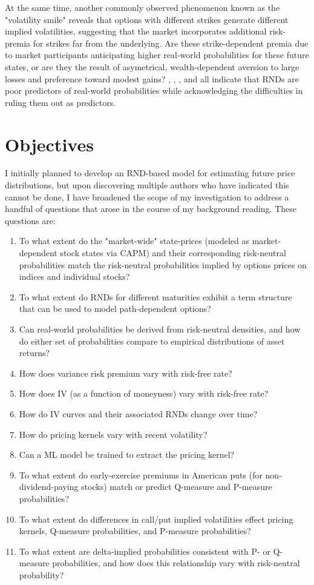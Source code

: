 \documentclass[final,3p,times,authoryear]{elsarticle}
\begin{document}
  At the same time, another commonly observed phenomenon known as the "volatility smile" reveals that options with different strikes generate different implied volatilities, suggesting that the market incorporates additional risk-premia for strikes far from the underlying. Are these strike-dependent premia due to market participants anticipating higher real-world probabilities for these future states, or are they the result of asymetrical, wealth-dependent aversion to large losses and preference toward modest gains? \citet{jackwerth_option-implied_2004}, \citet{figlewski_risk-netrual_2018}, \citet{shiratsuka_information_2001}, and \citet{anagnou_relation_2002} all indicate that RNDs are poor predictors of real-world probabilities while acknowledging the difficulties in ruling them out as predictors. 

\section{Objectives}
  \label{objectives}
  I initially planned to develop an RND-based model for estimating future price distributions, but upon discovering multiple authors who have indicated this cannot be done, I have broadened the scope of my investigation to address a handful of questions that arose in the course of my background reading. These questions are:
  \begin{enumerate}
    \item To what extent do the "market-wide" state-prices (modeled as market-dependent stock states via CAPM) and their corresponding risk-neutral probabilities match the risk-neutral probabilities implied by options prices on indices and individual stocks?
    \item To what extent do RNDs for different maturities exhibit a term structure that can be used to model path-dependent options?
    \item Can real-world probabilities be derived from risk-neutral densities, and how do either set of probabilities compare to empirical distributions of asset returns?
    \item How does variance risk premium vary with risk-free rate?
    \item How does IV (as a function of moneyness) vary with risk-free rate?
    \item How do IV curves and their associated RNDs change over time?
    \item How do pricing kernels vary with recent volatility?
    \item Can a ML model be trained to extract the pricing kernel?
    \item To what extent do early-exercise premiums in American puts (for non-dividend-paying stocks) match or predict Q-measure and P-measure probabilities?
    \item To what extent do differences in call/put implied volatilities effect pricing kernels, Q-measure probabilities, and P-measure probabilities?
    \item To what extent are delta-implied probabilities consistent with P- or Q- measure probabilities, and how does this relationship vary with risk-neutral probability?
  \end{enumerate}
\end{document}
